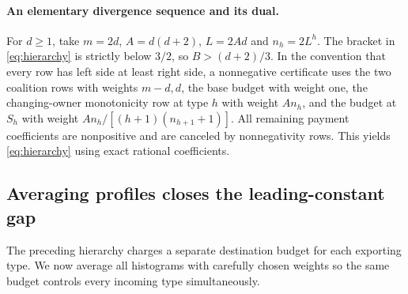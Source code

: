 \documentclass[11pt]{article}
\theoremstyle{definition}\newtheorem{definition}[theorem]{Definition}
\theoremstyle{remark}\newtheorem{remark}[theorem]{Remark}
\begin{document}
\paragraph{An elementary divergence sequence and its dual.}
For $d\ge1$, take $m=2d$, $A=d(d+2)$, $L=2Ad$ and $n_h=2L^h$.
The bracket in \eqref{eq:hierarchy} is strictly below $3/2$, so
$B>(d+2)/3$. In the convention that every row has left side at least
right side, a nonnegative certificate uses the two coalition rows with
weights $m-d,d$, the base budget with weight one, the changing-owner
monotonicity row at type $h$ with weight $An_h$, and the budget at $S_h$
with weight $An_h/[(h+1)(n_{h+1}+1)]$. All remaining payment coefficients
are nonpositive and are canceled by nonnegativity rows. This yields
\eqref{eq:hierarchy} using exact rational coefficients.

\subsection{Averaging profiles closes the leading-constant gap}
The preceding hierarchy charges a separate destination budget for each
exporting type. We now average all histograms with carefully chosen weights
so the same budget controls every incoming type simultaneously.
\end{document}
